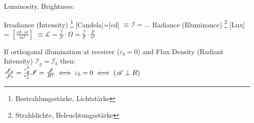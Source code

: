 Luminosity, Brightness:

\vspace{5ex}  \noindent
Irradiance (Intensity) \footnote{Bestrahlungsstärke, Lichtstärke} [Candela]=[cd] $ \equiv \mathscr{I} = ...
$	\qquad
\newline
Radiance (Illuminance) \footnote{Strahldichte, Beleuchtungsstärke} [Lux] = $[\frac{cd \cdot sr}{m^2}]$ $ \equiv
\mathscr{L} = 
\frac{\mathscr{I}}{F} \cdot \Omega = 
\frac{\mathscr{I}}{F}\cdot \frac{F}{r^2}
$

If orthogonal illumination at receiver ($\varepsilon_b = 0$) and Flux Density (Radiant Intensity) $\mathscr{I}_g = \mathscr{I}_b$ then:\\
$
\frac{\mathscr{J}_g}{\mathscr{J}_b} = \frac{r_g^2}{r_b^2} \\
\mathscr{I} = \frac{\mathscr{J}}{R^2} \iff \varepsilon_b=0 \iff  (\mathscr{A} \perp R)
$

\vspace{4ex}


